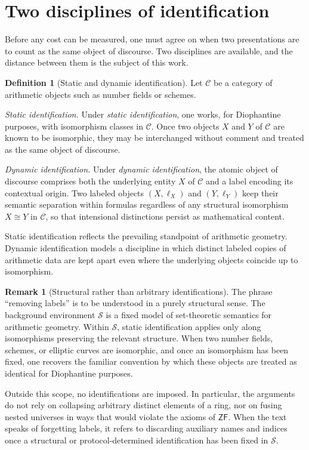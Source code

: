 \documentclass[10pt, reqno]{amsart}
\theoremstyle{plain}
\theoremstyle{definition}
\newtheorem{definition}[theorem]{Definition}
\newtheorem{remark}[theorem]{Remark}
\theoremstyle{plain}
\newcommand{\ZF}{\mathsf{ZF}}
\begin{document}
\section{Two disciplines of identification}\label{sec:identification}

Before any cost can be measured, one must agree on when two presentations are to count as the same object of discourse. Two disciplines are available, and the distance between them is the subject of this work.

\begin{definition}[Static and dynamic identification]\label{def:StaticDynamic}
Let $\mathcal{C}$ be a category of arithmetic objects such as number fields or schemes.

\smallskip
\noindent \textit{Static identification.} Under \emph{static identification}, one works, for Diophantine purposes, with isomorphism classes in $\mathcal{C}$. Once two objects $X$ and $Y$ of $\mathcal{C}$ are known to be isomorphic, they may be interchanged without comment and treated as the same object of discourse.

\smallskip
\noindent \textit{Dynamic identification.} Under \emph{dynamic identification}, the atomic object of discourse comprises both the underlying entity $X$ of $\mathcal{C}$ and a label encoding its contextual origin. Two labeled objects $(X,\ell_X)$ and $(Y,\ell_Y)$ keep their semantic separation within formulas regardless of any structural isomorphism $X \cong Y$ in $\mathcal{C}$, so that intensional distinctions persist as mathematical content.

Static identification reflects the prevailing standpoint of arithmetic geometry. Dynamic identification models a discipline in which distinct labeled copies of arithmetic data are kept apart even where the underlying objects coincide up to isomorphism.
\end{definition}

\begin{remark}[Structural rather than arbitrary identifications]\label{rem:ArbitraryStructural}
The phrase ``removing labels'' is to be understood in a purely structural sense. The background environment $\mathcal{S}$ is a fixed model of set-theoretic semantics for arithmetic geometry. Within $\mathcal{S}$, static identification applies only along isomorphisms preserving the relevant structure. When two number fields, schemes, or elliptic curves are isomorphic, and once an isomorphism has been fixed, one recovers the familiar convention by which these objects are treated as identical for Diophantine purposes.

Outside this scope, no identifications are imposed. In particular, the arguments do not rely on collapsing arbitrary distinct elements of a ring, nor on fusing nested universes in ways that would violate the axioms of $\ZF$. When the text speaks of forgetting labels, it refers to discarding auxiliary names and indices once a structural or protocol-determined identification has been fixed in $\mathcal{S}$.
\end{remark}
\end{document}

